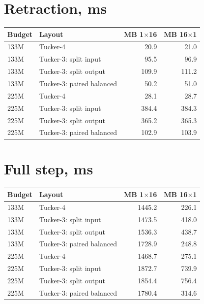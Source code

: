 \documentclass[10pt]{article}
\begin{document}
\section{Retraction, ms}
\begin{center}
\small
\begin{tabular}{llrr}
\toprule
\textbf{Budget} & \textbf{Layout} & \textbf{MB 1$\times$16} & \textbf{MB 16$\times$1} \\
\midrule
133M & Tucker-4 & 20.9 & 21.0 \\
133M & Tucker-3: split input & 95.5 & 96.9 \\
133M & Tucker-3: split output & 109.9 & 111.2 \\
133M & Tucker-3: paired balanced & 50.2 & 51.0 \\
225M & Tucker-4 & 28.1 & 28.7 \\
225M & Tucker-3: split input & 384.4 & 384.3 \\
225M & Tucker-3: split output & 365.2 & 365.3 \\
225M & Tucker-3: paired balanced & 102.9 & 103.9 \\
\bottomrule
\end{tabular}
\end{center}
\section{Full step, ms}
\begin{center}
\small
\begin{tabular}{llrr}
\toprule
\textbf{Budget} & \textbf{Layout} & \textbf{MB 1$\times$16} & \textbf{MB 16$\times$1} \\
\midrule
133M & Tucker-4 & 1445.2 & 226.1 \\
133M & Tucker-3: split input & 1473.5 & 418.0 \\
133M & Tucker-3: split output & 1536.3 & 438.7 \\
133M & Tucker-3: paired balanced & 1728.9 & 248.8 \\
225M & Tucker-4 & 1468.7 & 275.1 \\
225M & Tucker-3: split input & 1872.7 & 739.9 \\
225M & Tucker-3: split output & 1854.4 & 756.4 \\
225M & Tucker-3: paired balanced & 1780.4 & 314.6 \\
\bottomrule
\end{tabular}
\end{center}
\end{document}
